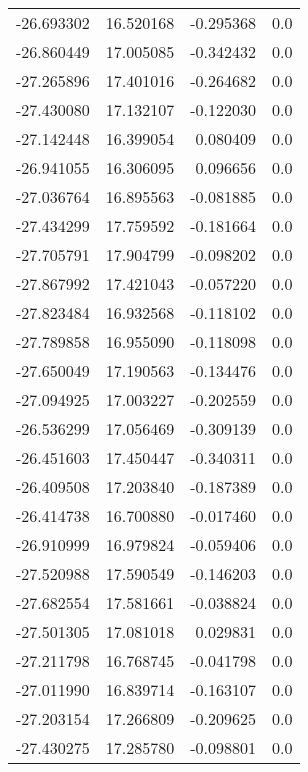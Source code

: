 \begin{tabular}{rrrr}
      -26.693302 &        16.520168 &   -0.295368 &   0.0 \\
      -26.860449 &        17.005085 &   -0.342432 &   0.0 \\
      -27.265896 &        17.401016 &   -0.264682 &   0.0 \\
      -27.430080 &        17.132107 &   -0.122030 &   0.0 \\
      -27.142448 &        16.399054 &    0.080409 &   0.0 \\
      -26.941055 &        16.306095 &    0.096656 &   0.0 \\
      -27.036764 &        16.895563 &   -0.081885 &   0.0 \\
      -27.434299 &        17.759592 &   -0.181664 &   0.0 \\
      -27.705791 &        17.904799 &   -0.098202 &   0.0 \\
      -27.867992 &        17.421043 &   -0.057220 &   0.0 \\
      -27.823484 &        16.932568 &   -0.118102 &   0.0 \\
      -27.789858 &        16.955090 &   -0.118098 &   0.0 \\
      -27.650049 &        17.190563 &   -0.134476 &   0.0 \\
      -27.094925 &        17.003227 &   -0.202559 &   0.0 \\
      -26.536299 &        17.056469 &   -0.309139 &   0.0 \\
      -26.451603 &        17.450447 &   -0.340311 &   0.0 \\
      -26.409508 &        17.203840 &   -0.187389 &   0.0 \\
      -26.414738 &        16.700880 &   -0.017460 &   0.0 \\
      -26.910999 &        16.979824 &   -0.059406 &   0.0 \\
      -27.520988 &        17.590549 &   -0.146203 &   0.0 \\
      -27.682554 &        17.581661 &   -0.038824 &   0.0 \\
      -27.501305 &        17.081018 &    0.029831 &   0.0 \\
      -27.211798 &        16.768745 &   -0.041798 &   0.0 \\
      -27.011990 &        16.839714 &   -0.163107 &   0.0 \\
      -27.203154 &        17.266809 &   -0.209625 &   0.0 \\
      -27.430275 &        17.285780 &   -0.098801 &   0.0 \\

\end{tabular}
